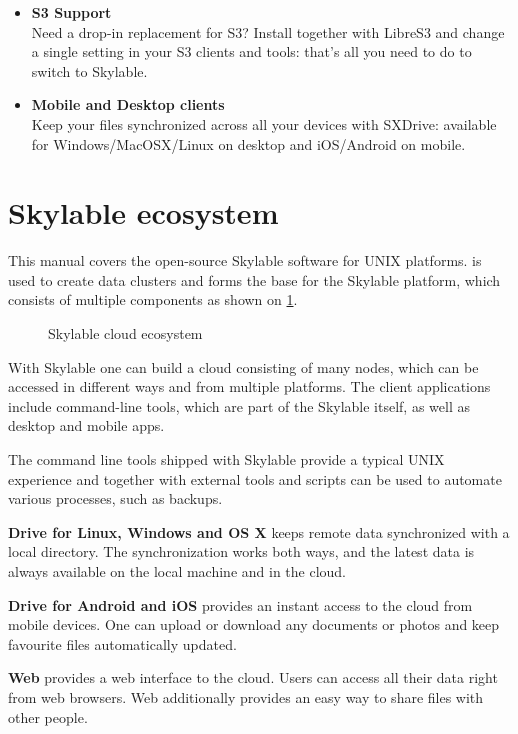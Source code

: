 \begin{itemize}
    \item \textbf{S3 Support}\\
    Need a drop-in replacement for S3? Install \SX together with LibreS3 and
    change a single setting in your S3 clients and tools: that's all you need
    to do to switch to Skylable.

    \item \textbf{Mobile and Desktop clients}\\
    Keep your files synchronized across all your devices with SXDrive: available
    for Windows/MacOSX/Linux on desktop and iOS/Android on mobile.
\end{itemize}

\section{Skylable ecosystem}
This manual covers the open-source Skylable \SX software for UNIX platforms.
\SX is used to create data clusters and forms the base for the Skylable
platform, which consists of multiple components as shown on \ifpdf{}\else\ref{fig:components}.\fi
\begin{figure}
    \centering
    
    \caption{Skylable cloud ecosystem}
    \label{fig:components}
\end{figure}
With Skylable \SX one can build a cloud consisting of many nodes, which can
be accessed in different ways and from multiple platforms. The client
applications include command-line tools, which are part of the Skylable \SX
itself, as well as desktop and mobile apps.

The command line tools shipped with Skylable \SX provide a typical UNIX
experience and together with external tools and scripts can be used to
automate various processes, such as backups.

\textbf{\SX Drive for Linux, Windows and OS X} keeps remote data synchronized with
a local directory. The synchronization works both ways, and the latest data
is always available on the local machine and in the cloud.

\textbf{\SX Drive for Android and iOS} provides an instant access to the cloud from
mobile devices. One can upload or download any documents or photos and keep
favourite files automatically updated.

\textbf{\SX Web} provides a web interface to the cloud. Users can access all their
data right from web browsers. \SX Web additionally provides an easy way to
share files with other people.

